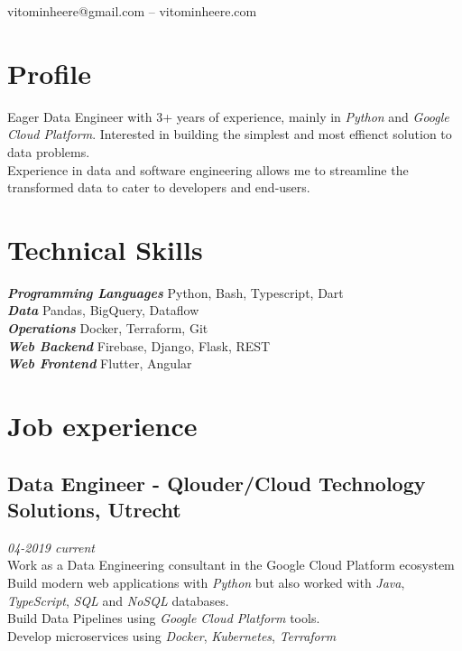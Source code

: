 \documentclass{article}
\makeatletter
\renewcommand{\maketitle}{
\begin{center}
	{\huge\bfseries
	\theauthor}

\vspace*{1cm}
vitominheere@gmail.com -- vitominheere.com

\end{center}
}
\makeatother
\begin{document}
\author{Vito Minheere}


\maketitle

\section{\sc Profile}
Eager Data Engineer with 3+ years of experience, mainly in \emph{Python} and \emph{Google Cloud Platform}. Interested in building the simplest and most effienct solution to data problems. \\
Experience in data and software engineering allows me to streamline the transformed data to cater to developers and end-users.

\section{\sc Technical Skills}
{\sl \textbf{Programming Languages}} Python, Bash, Typescript, Dart \\
{\sl \textbf{Data }} Pandas, BigQuery, Dataflow \\
{\sl \textbf{Operations }} Docker, Terraform, Git \\
{\sl \textbf{Web Backend }} Firebase, Django, Flask, REST \\
{\sl \textbf{Web Frontend }} Flutter, Angular \\

\section{\sc Job experience}
\subsection{Data Engineer - Qlouder/Cloud Technology Solutions, Utrecht} \hfill {\em 04-2019 current} \\
Work as a Data Engineering consultant in the Google Cloud Platform ecosystem \\
Build modern web applications with \emph{Python} but also worked with \emph{Java}, \emph{TypeScript}, \emph{SQL} and \emph{NoSQL} databases. \\
Build Data Pipelines using \emph{Google Cloud Platform} tools. \\
Develop microservices using \emph{Docker}, \emph{Kubernetes}, \emph{Terraform} \\
\end{document}
